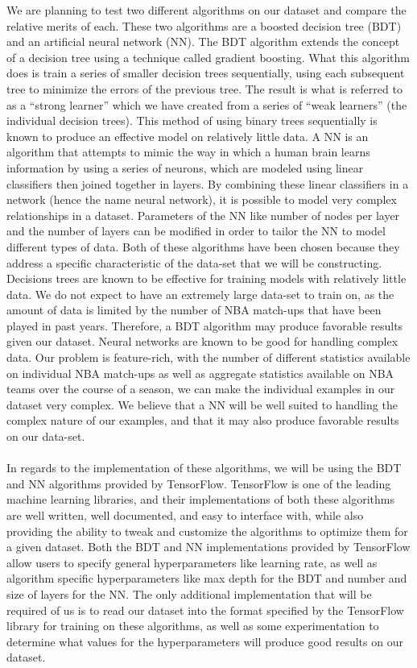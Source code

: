 \documentclass[letterpaper]{article} %
\begin{document}
We are planning to test two different algorithms on our dataset and compare the relative merits of each. These two algorithms are a boosted decision tree (BDT) and an artificial neural network (NN). The BDT algorithm extends the concept of a decision tree using a technique called gradient boosting. What this algorithm does is train a series of smaller decision trees sequentially, using each subsequent tree to minimize the errors of the previous tree. The result is what is referred to as a “strong learner” which we have created from a series of “weak learners” (the individual decision trees). This method of using binary trees sequentially is known to produce an effective model on relatively little data. A NN is an algorithm that attempts to mimic the way in which a human brain learns information by using a series of neurons, which are modeled using linear classifiers then joined together in layers. By combining these linear classifiers in a network (hence the name neural network), it is possible to model very complex relationships in a dataset. Parameters of the NN like number of nodes per layer and the number of layers can be modified in order to tailor the NN to model different types of data. Both of these algorithms have been chosen because they address a specific characteristic of the data-set that we will be constructing. Decisions trees are known to be effective for training models with relatively little data. We do not expect to have an extremely large data-set to train on, as the amount of data is limited by the number of NBA match-ups that have been played in past years. Therefore, a BDT algorithm may produce favorable results given our dataset. Neural networks are known to be good for handling complex data. Our problem is feature-rich, with the number of different statistics available on individual NBA match-ups as well as aggregate statistics available on NBA teams over the course of a season, we can make the individual examples in our dataset very complex. We believe that a 
NN will be well suited to handling the complex nature of our examples, and that it may also produce favorable results on our data-set. \\ \\ 
In regards to the implementation of these algorithms, we will be using the BDT and NN algorithms provided by TensorFlow. TensorFlow is one of the leading machine learning libraries, and their implementations of both these algorithms are well written, well documented, and easy to interface with, while also providing the ability to tweak and customize the algorithms to optimize them for a given dataset. Both the BDT and NN implementations provided by TensorFlow allow users to specify general hyperparameters like learning rate, as well as algorithm specific hyperparameters like max depth for the BDT and number and size of layers for the NN. The only additional implementation that will be required of us is to read our dataset into the format specified by the TensorFlow library for training on these algorithms, as well as some experimentation to determine what values for the hyperparameters will produce good results on our dataset. 
\end{document}
